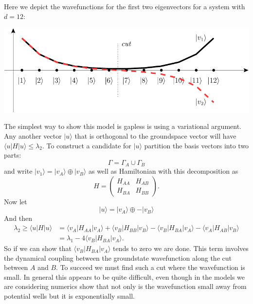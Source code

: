 \documentclass[11pt,oneside]{article}
\newcommand{\ket}[1]{|{#1}\rangle}
\newcommand{\bra}[1]{\langle{#1}|}
\newcommand{\braket}[2]{\langle{#1}|{#2}\rangle}
\begin{document}
Here we depict the wavefunctions for
the first two eigenvectors for a system with $d=12:$
\begin{center}
\includegraphics[]{pic-dwell.pdf}
\end{center}
The simplest way to show this model
is gapless is using a variational
argument.
Any another vector $\ket{u}$
that is orthogonal to the groundspace
vector will have $\bra{u}H\ket{u} \le \lambda_2.$
To construct a candidate for $\ket{u}$
partition the
basis vectors into two parts:
$$
    \Gamma = \Gamma_A \cup \Gamma_B
$$
and write $\ket{v_1} = 
\ket{v_A}\oplus\ket{v_B}$
as well as Hamiltonian with this
decomposition as
$$
H = 
\left(\begin{array}{ll}
H_{AA} & H_{AB} \\
H_{BA} & H_{BB}
\end{array}\right).
$$
Now let
$$
    \ket{u} = \ket{v_A} \oplus -\ket{v_B}
$$
And then
\begin{align*}
    \lambda_2 \ge \bra{u}H\ket{u} &= 
\bra{v_A}H_{AA}\ket{v_A} +
\bra{v_B}H_{BB}\ket{v_B} -
\bra{v_B}H_{BA}\ket{v_A} -
\bra{v_A}H_{AB}\ket{v_B} \\
    &= \lambda_1 - 4 \bra{v_B}H_{BA}\ket{v_A}.
\end{align*}
So if we can show that 
$ \bra{v_B}H_{BA}\ket{v_A}$
tends to zero we are done.
This term involves the 
dynamical coupling between the
groundstate wavefunction along
the cut between $A$ and $B$.
To succeed we must find such a cut where
the wavefunction is small. In general
this appears to be quite difficult,
even though in the models we are considering
numerics show that not only is the
wavefunction small away from potential wells
but it is exponentially small.

\end{document}
